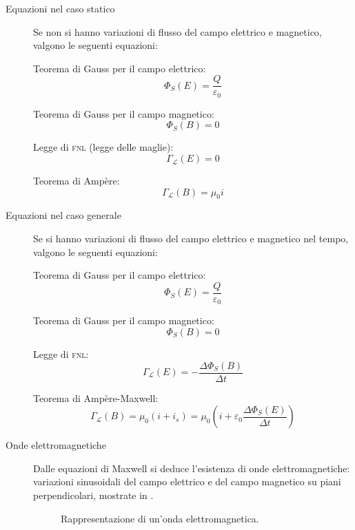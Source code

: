 \documentclass[a4paper,11pt,italian]{article}
\begin{document}
\begin{description}
%   
  
  \item[Equazioni nel caso statico] 
  Se non si hanno variazioni di flusso del campo elettrico e magnetico, valgono le seguenti equazioni:
\begin{multicols}{2}
Teorema di Gauss per il campo elettrico:
  \[ \Phi_S(E) = \frac{Q}{\varepsilon_0}  \]

Teorema di Gauss per il campo magnetico:
  \[ \Phi_S(B) = 0 \]

Legge di \textsc{fnl} (legge delle maglie):
  \[ \Gamma_\mathscr{L}(E) = 0 \]

Teorema di Ampère:
  \[ \Gamma_\mathscr{L}(B) = \mu_0 i \]
\end{multicols}  

  \item[Equazioni nel caso generale] 
  Se si hanno variazioni di flusso del campo elettrico e magnetico nel tempo, valgono le seguenti equazioni:
\begin{multicols}{2}
Teorema di Gauss per il campo elettrico:
  \[ \Phi_S(E) = \frac{Q}{\varepsilon_0}  \]

Teorema di Gauss per il campo magnetico:
  \[ \Phi_S(B) = 0 \]

Legge di \textsc{fnl}:
  \[ \Gamma_\mathscr{L}(E) = - \frac{\Delta\Phi_S(B)}{\Delta t} \]

Teorema di Ampère-Maxwell:
  \[ \Gamma_\mathscr{L}(B) = \mu_0 \left( i + i_s \right) = \mu_0 \left( i + \varepsilon_0 \frac{\Delta\Phi_S(E)}{\Delta t} \right) \]
\end{multicols}
  
  \item[Onde elettromagnetiche] 
  Dalle equazioni di Maxwell si deduce l'esistenza di onde elettromagnetiche: variazioni sinusoidali del campo elettrico e del campo magnetico su piani perpendicolari, mostrate in .
  \begin{figure}[htp]\centering
  
  \caption{Rappresentazione di un'onda elettromagnetica.}
  \label{img:ondaelettromagnetica}
  \end{figure}
  

\end{description}
\end{document}
